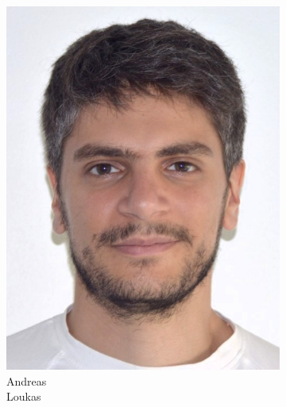 \documentclass[aspectratio=169]{beamer}
\begin{document}
\begin{frame}
\begin{figure}
\begin{subfigure}[b]{0.14\linewidth}
			\includegraphics[width=\linewidth]{picture_andreas}
			\caption*{Andreas\\Loukas}
		\end{subfigure}
		\hfill
		\begin{subfigure}[b]{0.14\linewidth}

\end{subfigure}
\end{figure}
\end{frame}
\end{document}
